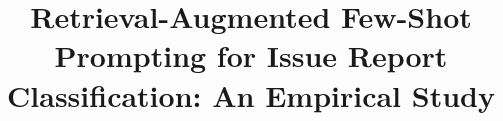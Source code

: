 \documentclass[10pt,conference]{IEEEtran}
\begin{document}
\title{Retrieval-Augmented Few-Shot Prompting for Issue Report Classification: An Empirical Study}

\author{%
}

\maketitle











\clearpage
\balance


\end{document}
